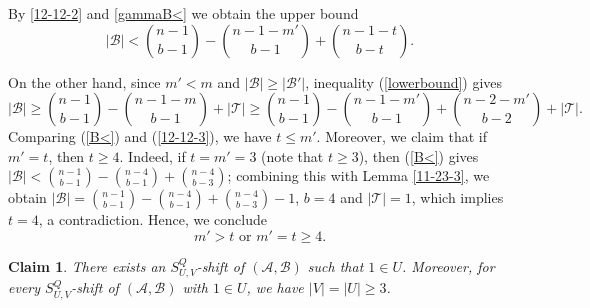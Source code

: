 \documentclass[11pt]{article}
\def\marrow{{\boldmath {\marginpar[\hfill$\rightarrow \rightarrow$]{$\leftarrow \leftarrow$}}}}
\def\andrey#1{{\sc Andrey: }{\marrow\sf \textcolor{blue}{#1}}}
\newcommand{\m}{\mathcal}
\def\yang#1{{\sc Yang: }{\marrow\sf \textcolor{cyan}{#1}}}
\newtheorem{claim}[theorem]{Claim}
\begin{document}
By \eqref{12-12-2} and \eqref{gammaB<} we obtain the upper bound
\begin{equation}\label{B<}
    |\mathcal{B}|<\binom{n-1}{b-1}-\binom{n-1-m'}{b-1}+\binom{n-1-t}{b-t}.
\end{equation} 

On the other hand, since $m'<m$ and $|\m B|\ge |\m B'|$, inequality (\ref{lowerbound}) gives
\begin{equation}\label{12-12-3}
|\mathcal{B}|\ge {n-1\choose b-1}-{n-1-m\choose b-1}+|\mathcal{T}|\ge {n-1\choose b-1}-{n-1-m'\choose b-1}+{n-2-m'\choose b-2}+|\mathcal{T}|.
\end{equation}
Comparing (\ref{B<}) and (\ref{12-12-3}), we have $t\le m'$. Moreover, we claim that if $m'=t$, then $t\ge 4$.
Indeed, if $t=m'=3$ (note that $t\ge 3$), then (\ref{B<}) gives 
$|\m B|<{n-1\choose b-1}-{n-4\choose b-1}+{n-4\choose b-3}$; combining this with Lemma \ref{11-23-3}, we obtain $|\m B|={n-1\choose b-1}-{n-4\choose b-1}+{n-4\choose b-3}-1$, $b=4$ and $|\m T|=1$, %
which implies $t=4$, a contradiction. Hence, we conclude
\begin{equation*}\label{m'>t}
m'>t\,\, \text{or}\,\, m'=t\ge 4.
\end{equation*}


\begin{claim}\label{1-11-1}
There exists an $S_{U,V}^Q$-shift of $(\m A, \m B)$  such that $1\in U$. Moreover, for every $S_{U,V}^Q$-shift of $(\m A, \m B)$ with $1\in U$, we have $|V|=|U|\ge 3$.   
\end{claim}
\end{document}
